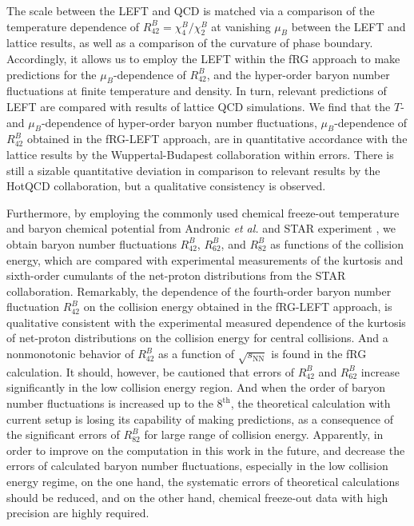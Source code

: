 \documentclass[%
reprint,
superscriptaddress,
showpacs,preprintnumbers,
amsmath,amssymb,
aps,
prd,
]{revtex4-1}
\begin{document}
The scale between the LEFT and QCD is matched via a comparison of the temperature dependence of $R^{B}_{42}=\chi^{B}_{4}/\chi^{B}_{2}$ at vanishing $\mu_B$ between the LEFT and lattice results, as well as a comparison of the curvature of phase boundary. Accordingly, it allows us to employ the LEFT within the fRG approach to make predictions for the $\mu_B$-dependence of $R^{B}_{42}$, and the hyper-order baryon number fluctuations at finite temperature and density. In turn, relevant predictions of LEFT are compared with results of lattice QCD simulations. We find that the $T$- and $\mu_B$-dependence of hyper-order baryon number fluctuations, $\mu_B$-dependence of $R^{B}_{42}$ obtained in the fRG-LEFT approach, are in quantitative accordance with the lattice results by the Wuppertal-Budapest collaboration within errors. There is still a sizable quantitative deviation in comparison to relevant results by the HotQCD collaboration, but a qualitative consistency is observed.
	
Furthermore, by employing the commonly used chemical freeze-out temperature and baryon chemical potential from Andronic {\it et al.} \cite{Andronic:2017pug} and STAR experiment \cite{Adamczyk:2017iwn}, we obtain baryon number fluctuations $R^{B}_{42}$, $R^{B}_{62}$, and $R^{B}_{82}$ as functions of the collision energy, which are compared with experimental measurements of the kurtosis and sixth-order cumulants of the net-proton distributions from the STAR collaboration. Remarkably, the dependence of the fourth-order baryon number fluctuation $R^{B}_{42}$ on the collision energy obtained in the fRG-LEFT approach, is qualitative consistent with the experimental measured dependence of the kurtosis of net-proton distributions on the collision energy for central collisions. And a nonmonotonic behavior of $R^{B}_{42}$ as a function of $\sqrt{s_{\mathrm{NN}}}$ is found in the fRG calculation. It should, however, be cautioned that errors of $R^{B}_{42}$ and $R^{B}_{62}$ increase significantly in the low collision energy region. And when the order of baryon number fluctuations is increased up to the $8^{\mathrm{th}}$, the theoretical calculation with current setup is losing its capability of making predictions, as a consequence of the significant errors of $R^{B}_{82}$ for large range of collision energy. Apparently, in order to improve on the computation in this work in the future, and decrease the errors of calculated baryon number fluctuations, especially in the low collision energy regime, on the one hand, the systematic errors of theoretical calculations should be reduced, and on the other hand, chemical freeze-out data with high precision are highly required.
	
\end{document}
